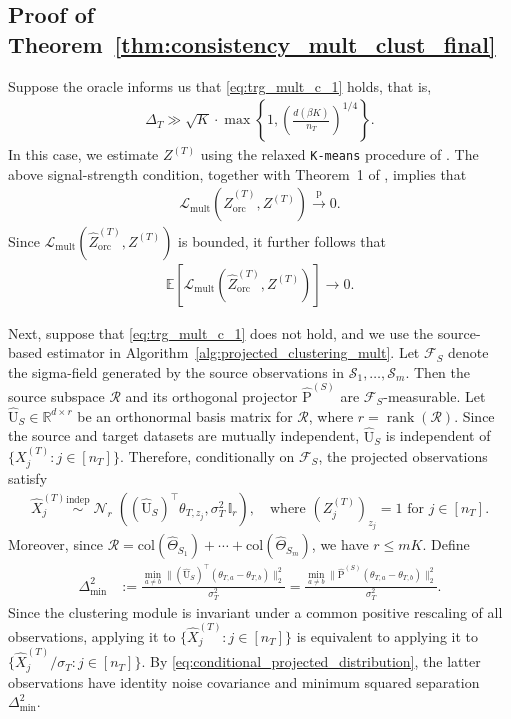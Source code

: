 \documentclass[10pt]{article}
\newcommand{\R}{\mathbb R}
\newcommand{\convp}{\xrightarrow{\mathrm{p}}}
\newcommand{\col}{\mathrm{col}}
\newcommand{\Id}{\mathbb I}
\newcommand{\wh}{\widehat}
\DeclareMathOperator{\dnorm}{\mathcal N}
\newcommand{\trg}{T}
\newcommand{\nT}{n_{\trg}}
\newcommand{\sigmaT}{\sigma_{\trg}}
\newcommand{\Xtar}{X^{(\trg)}}
\newcommand{\Ztar}{Z^{(\trg)}}
\newcommand{\thetamcT}[1]{\theta_{\trg,#1}}
\newcommand{\DeltaT}{\Delta_{\trg}}
\newcommand{\hatXtar}{\wh{X}^{(\trg)}}
\newcommand{\hatZtar}{\wh{Z}^{(\trg)}}
\newcommand{\calS}{\mathcal S}
\newcommand{\src}{S}
\newcommand{\hatThetaS}[1]{\wh{\Theta}_{S_{#1}}}
\newcommand{\Pest}{\wh{\mathrm P}}
\begin{document}
\subsection{Proof of Theorem~\ref{thm:consistency_mult_clust_final}}
Suppose the oracle informs us that \eqref{eq:trg_mult_c_1} holds, that is,
\begin{align}
    \DeltaT \gg \sqrt K\cdot
    \max\left\{1,\left(\frac{d(\beta K)}{\nT}\right)^{1/4}\right\}.
\end{align}
In this case, we estimate $\Ztar$ using the relaxed \texttt{K-means} procedure
of \cite{giraud2019partial}. The above signal-strength condition, together
with Theorem~1 of \cite{giraud2019partial}, implies that
\begin{align}
    \mathcal L_{\mathrm{mult}}(\hatZtar_{\mathrm{orc}},\Ztar)\convp 0.
\end{align}
Since $\mathcal L_{\mathrm{mult}}(\hatZtar_{\mathrm{orc}},\Ztar)$ is bounded, it further
follows that
\begin{align}
    \mathbb E\left[\mathcal L_{\mathrm{mult}}(\hatZtar_{\mathrm{orc}},\Ztar)\right]\to 0.
\end{align}

Next, suppose that \eqref{eq:trg_mult_c_1} does not hold, and we
use the source-based estimator in Algorithm~\ref{alg:projected_clustering_mult}.
Let $\mathcal F_\src$ denote the sigma-field generated by the source
observations in $\calS_1,\ldots,\calS_m$. Then the source subspace
$\mathcal R$ and its orthogonal projector $\Pest^{(\src)}$ are
$\mathcal F_\src$-measurable. Let $\widehat{\mathrm U}_\src\in\R^{d\times r}$
be an orthonormal basis matrix for $\mathcal R$, where
$r=\operatorname{rank}(\mathcal R)$. Since the source and target datasets are
mutually independent, $\widehat{\mathrm U}_\src$ is independent of
$\{\Xtar_j:j\in[\nT]\}$. Therefore, conditionally on $\mathcal F_\src$, the
projected observations satisfy
\begin{align}
\label{eq:conditional_projected_distribution}
    \hatXtar_j
    \overset{\mathrm{indep}}{\sim}
    \dnorm_r\left((\widehat{\mathrm U}_\src)^\top\thetamcT{z_j},
    \sigmaT^2\,\Id_r\right),
    \quad \mbox{where $(\Ztar_j)_{z_j}=1$ for $j\in[\nT]$.}
\end{align}
Moreover, since $\mathcal R=\col(\hatThetaS{1})+\cdots+\col(\hatThetaS{m})$,
we have $r\le mK$. Define
\begin{align}
\label{eq:delta_min_b}
    \Delta_{\min}^2
    &:=
    \frac{\displaystyle \min_{a\neq b}
    \|(\widehat{\mathrm U}_\src)^\top(\thetamcT{a}-\thetamcT{b})\|_2^2}
    {\sigmaT^2}
    =
    \frac{\displaystyle \min_{a\neq b}
    \|\Pest^{(\src)}(\thetamcT{a}-\thetamcT{b})\|_2^2}
    {\sigmaT^2}.
\end{align}
Since the clustering module is invariant under a common positive rescaling of
all observations, applying it to $\{\hatXtar_j:j\in[\nT]\}$ is equivalent to
applying it to $\{\hatXtar_j/\sigmaT:j\in[\nT]\}$. By
\eqref{eq:conditional_projected_distribution}, the latter observations have
identity noise covariance and minimum squared separation $\Delta_{\min}^2$.
\end{document}
